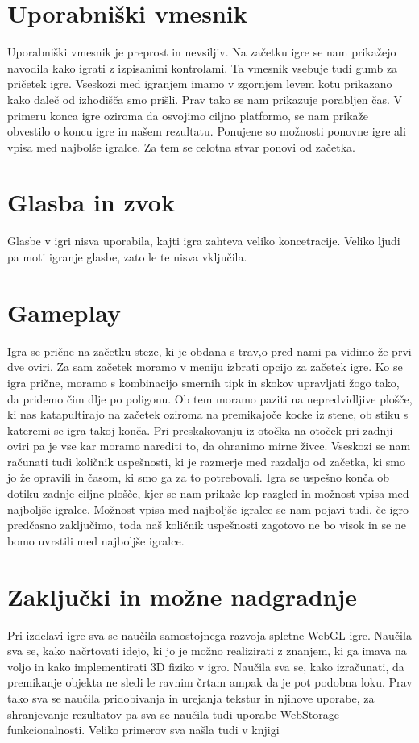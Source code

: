 \documentclass[a4paper]{article}
\begin{document}
\section{Uporabniški vmesnik}
Uporabniški vmesnik je preprost in nevsiljiv. Na začetku igre se nam prikažejo navodila kako igrati z izpisanimi kontrolami. Ta vmesnik vsebuje tudi gumb za pričetek igre. Vseskozi med igranjem imamo v zgornjem levem kotu prikazano kako daleč od izhodišča smo prišli. Prav tako se nam prikazuje porabljen čas. V primeru konca igre oziroma da osvojimo ciljno platformo, se nam prikaže obvestilo o koncu igre in našem rezultatu. Ponujene so možnosti ponovne igre ali vpisa med najbolše igralce. Za tem se celotna stvar ponovi od začetka.

\section{Glasba in zvok}
Glasbe v igri nisva uporabila, kajti igra zahteva veliko koncetracije. Veliko ljudi pa moti igranje glasbe, zato le te nisva vključila.

\section{Gameplay}
Igra se prične na začetku steze, ki je obdana s trav,o pred nami pa vidimo že prvi dve oviri. Za sam začetek moramo v meniju izbrati opcijo za začetek igre. Ko se igra prične, moramo s kombinacijo smernih tipk in skokov upravljati žogo tako, da pridemo čim dlje po poligonu. Ob tem moramo paziti na nepredvidljive plošče, ki nas katapultirajo na začetek oziroma na premikajoče kocke iz stene, ob stiku s kateremi se igra takoj konča. Pri preskakovanju iz otočka na otoček pri zadnji oviri pa je vse kar moramo narediti to, da ohranimo mirne živce. Vseskozi se nam računati tudi količnik uspešnosti, ki je razmerje med razdaljo od začetka, ki smo jo že opravili in časom, ki smo ga za to potrebovali. Igra se uspešno konča ob dotiku zadnje ciljne plošče, kjer se nam prikaže lep razgled in možnost vpisa med najboljše igralce. Možnost vpisa med najboljše igralce se nam pojavi tudi, če igro predčasno zaključimo, toda naš količnik uspešnosti zagotovo ne bo visok in se ne bomo uvrstili med najboljše igralce.


\section{Zaključki in možne nadgradnje}
Pri izdelavi igre sva se naučila samostojnega razvoja spletne WebGL igre. Naučila sva se, kako načrtovati idejo, ki jo je možno realizirati z znanjem, ki ga imava na voljo in kako implementirati 3D fiziko v igro. Naučila sva se, kako izračunati, da premikanje objekta ne sledi le ravnim črtam ampak da je pot podobna loku. Prav tako sva se naučila pridobivanja in urejanja tekstur in njihove uporabe, za shranjevanje rezultatov pa sva se naučila tudi uporabe WebStorage funkcionalnosti. Veliko primerov sva našla tudi v knjigi \cite{dirksen2013learning}
\end{document}
